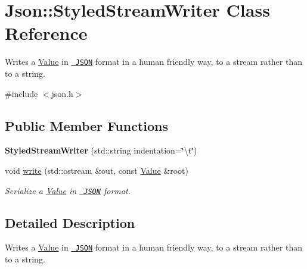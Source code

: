 \hypertarget{class_json_1_1_styled_stream_writer}{}\section{Json\+::Styled\+Stream\+Writer Class Reference}
\label{class_json_1_1_styled_stream_writer}


Writes a \mbox{\hyperlink{class_json_1_1_value}{Value}} in \href{http://www.json.org}{\texttt{ J\+S\+ON}} format in a human friendly way, to a stream rather than to a string.  




{\ttfamily \#include $<$json.\+h$>$}

\subsection*{Public Member Functions}
\begin{DoxyCompactItemize}
\item 
\mbox{\label{class_json_1_1_styled_stream_writer_ae87567a08de865b6dc84d7218a3001df}} 
{\bfseries Styled\+Stream\+Writer} (std\+::string indentation=\char`\"{}\textbackslash{}t\char`\"{})
\item 
void \mbox{\hyperlink{class_json_1_1_styled_stream_writer_a07807741c6c43ecd35885a87234d0805}{write}} (std\+::ostream \&out, const \mbox{\hyperlink{class_json_1_1_value}{Value}} \&root)
\begin{DoxyCompactList}\small\item\em Serialize a \mbox{\hyperlink{class_json_1_1_value}{Value}} in \href{http://www.json.org}{\texttt{ J\+S\+ON}} format. \end{DoxyCompactList}\end{DoxyCompactItemize}


\subsection{Detailed Description}
Writes a \mbox{\hyperlink{class_json_1_1_value}{Value}} in \href{http://www.json.org}{\texttt{ J\+S\+ON}} format in a human friendly way, to a stream rather than to a string. 

